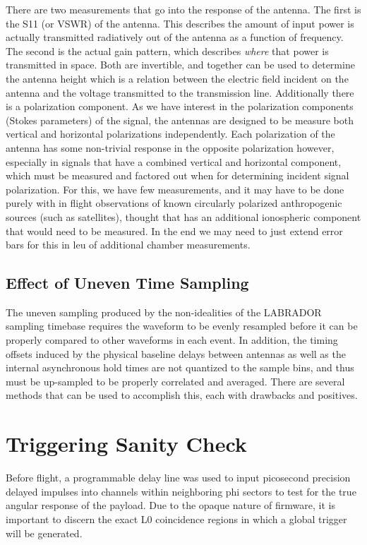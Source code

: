 		There are two measurements that go into the response of the antenna.  The first is the S11 (or VSWR) of the antenna.  This describes the amount of input power is actually transmitted radiatively out of the antenna as a function of frequency.  The second is the actual gain pattern, which describes \textit{where} that power is transmitted in space.  Both are invertible, and together can be used to determine the antenna height which is a relation between the electric field incident on the antenna and the voltage transmitted to the transmission line.
		Additionally there is a polarization component.  As we have interest in the polarization components (Stokes parameters) of the signal, the antennas are designed to be measure both vertical and horizontal polarizations independently.  Each polarization of the antenna has some non-trivial response in the opposite polarization however, especially in signals that have a combined vertical and horizontal component, which must be measured and factored out when for determining incident signal polarization.  For this, we have few measurements, and it may have to be done purely with in flight observations of known circularly polarized anthropogenic sources (such as satellites), thought that has an additional ionospheric component that would need to be measured.  In the end we may need to just extend error bars for this in leu of additional chamber measurements.
	\subsection{Effect of Uneven Time Sampling}
	The uneven sampling produced by the non-idealities of the LABRADOR sampling timebase requires the waveform to be evenly resampled before it can be properly compared to other waveforms in each event.  In addition, the timing offsets induced by the physical baseline delays between antennas as well as the internal asynchronous hold times are not quantized to the sample bins, and thus must be up-sampled to be properly correlated and averaged.  There are several methods that can be used to accomplish this, each with drawbacks and positives.

	

	
	
\section{Triggering Sanity Check}
		Before flight, a programmable delay line was used to input picosecond precision delayed impulses into channels within neighboring phi sectors to test for the true angular response of the payload.  Due to the opaque nature of firmware, it is important to discern the exact L0 coincidence regions in which a global trigger will be generated.
